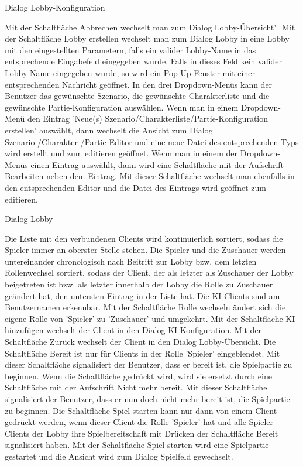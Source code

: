 

Dialog \glqq{}Lobby-Konfiguration\grqq{}

Mit der Schaltfläche \glqq{}Abbrechen\grqq{} wechselt man zum Dialog \glqq{}Lobby-Übersicht".
Mit der Schaltfläche \glqq{}Lobby erstellen\grqq{} wechselt man zum Dialog \glqq{}Lobby\grqq{} in eine Lobby mit den eingestellten Parametern, falls ein valider Lobby-Name in das entsprechende Eingabefeld eingegeben wurde.
Falls in dieses Feld kein valider Lobby-Name eingegeben wurde, so wird ein Pop-Up-Fenster mit einer entsprechenden Nachricht geöffnet.
In den drei Dropdown-Menüs kann der Benutzer das gewünschte Szenario, die gewünschte Charakterliste und die gewünschte Partie-Konfiguration auswählen. Wenn man in einem Dropdown-Menü den Eintrag 'Neue(s) Szenario/Charakterliste/Partie-Konfiguration erstellen' auswählt, dann wechselt die Ansicht zum Dialog \glqq{}Szenario-/Charakter-/Partie-Editor\grqq{} und eine neue Datei des entsprechenden Typs wird erstellt und zum editieren geöffnet.
Wenn man in einem der Dropdown-Menüs einen Eintrag auswählt, dann wird eine Schaltfläche mit der Aufschrift \glqq{}Bearbeiten\grqq{} neben dem Eintrag. Mit dieser Schaltfläche wechselt man ebenfalls in den entsprechenden Editor und die Datei des Eintrags wird geöffnet zum editieren.

Dialog \glqq{}Lobby\grqq{}

Die Liste mit den verbundenen Clients wird kontinuierlich sortiert, sodass die Spieler immer an oberster Stelle stehen. Die Spieler und die Zuschauer werden untereinander chronologisch nach Beitritt zur Lobby bzw. dem letzten Rollenwechsel sortiert, sodass der Client, der als letzter als Zuschauer der Lobby beigetreten ist bzw. als letzter innerhalb der Lobby die Rolle zu Zuschauer geändert hat, den untersten Eintrag in der Liste hat. Die KI-Clients sind am Benutzernamen erkennbar. 
Mit der Schaltfläche \glqq{}Rolle wechseln\grqq{} ändert sich die eigene Rolle von 'Spieler' zu 'Zuschauer' und umgekehrt. 
Mit der Schaltfläche \glqq{}KI hinzufügen\grqq{} wechselt der Client in den Dialog \glqq{}KI-Konfiguration\grqq{}.
Mit der Schaltfläche \glqq{}Zurück\grqq{} wechselt der Client in den Dialog \glqq{}Lobby-Übersicht\grqq{}.
Die Schaltfläche \glqq{}Bereit\grqq{} ist nur für Clients in der Rolle 'Spieler' eingeblendet. Mit dieser Schaltfläche signalisiert der Benutzer, dass er bereit ist, die Spielpartie zu beginnen. Wenn die Schaltfläche gedrückt wird, wird sie ersetzt durch eine Schaltfläche mit der Aufschrift \glqq{}Nicht mehr bereit\grqq{}. Mit dieser Schaltfläche signalisiert der Benutzer, dass er nun doch nicht mehr bereit ist, die Spielpartie zu beginnen. Die Schaltfläche \glqq{}Spiel starten\grqq{} kann nur dann von einem Client gedrückt werden, wenn dieser Client die Rolle 'Spieler' hat und alle Spieler-Clients der Lobby ihre Spielbereitschaft mit Drücken der Schaltfläche \glqq{}Bereit\grqq{} signalisiert haben.
Mit der Schaltfläche \glqq{}Spiel starten\grqq{} wird eine Spielpartie gestartet und die Ansicht wird zum Dialog \glqq{}Spielfeld\grqq{} gewechselt.

